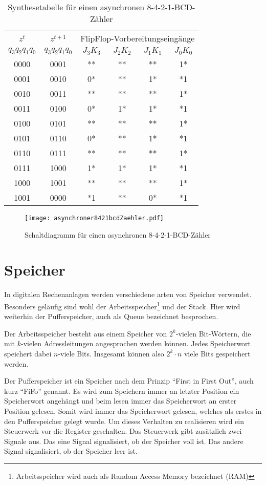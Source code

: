 \begin{table}[htp]
\centering
\begin{tabular}{cc|cccc}
$z^t$ & $z^{t+1}$ & \multicolumn{4}{|c}{FlipFlop-Vorbereitungseingänge}\\
$q_3q_2q_1q_0$ & $q_3q_2q_1q_0$ & $J_3K_3$ & $J_2K_2$ & $J_1K_1$ & $J_0K_0$\\ \hline
0000 & 0001 & ** & ** & ** & 1*\\
0001 & 0010 & 0* & ** & 1* & *1\\
0010 & 0011 & ** & ** & ** & 1*\\
0011 & 0100 & 0* & 1* & 1* & *1\\
0100 & 0101 & ** & ** & ** & 1*\\
0101 & 0110 & 0* & ** & 1* & *1\\
0110 & 0111 & ** & ** & ** & 1*\\
0111 & 1000 & 1* & 1* & 1* & *1\\
1000 & 1001 & ** & ** & ** & 1*\\
1001 & 0000 & *1 & ** & 0* & *1\\
\end{tabular}
\caption{Synthesetabelle für einen asynchronen 8-4-2-1-BCD-Zähler}
\label{AsyZaehTab}
\end{table}

\begin{figure}[htp]
	\centering
	\texttt{[image: asynchroner8421bcdZaehler.pdf]}
	\caption{Schaltdiagramm für einen asynchronen 8-4-2-1-BCD-Zähler}
	\label{AsyZaehScha}
\end{figure}

\section{Speicher}
In digitalen Rechenanlagen werden verschiedene arten von Speicher verwendet. Besonders geläufig sind wohl der Arbeitsspeicher\footnote{Arbeitsspeicher wird auch als Random Access Memory bezeichnet (RAM)} und der Stack. Hier wird weiterhin der Pufferspeicher, auch als Queue bezeichnet besprochen.

Der Arbeitsspeicher besteht aus einem Speicher von $2^k$-vielen Bit-Wörtern, die mit $k$-vielen Adressleitungen angesprochen werden können. Jedes Speicherwort speichert dabei $n$-viele Bits. Insgesamt können also $2^k \cdot n$ viele Bits gespeichert werden.

Der Pufferspeicher ist ein Speicher nach dem Prinzip "`First in First Out"', auch kurz "`FiFo"' genannt. Es wird zum Speichern immer an letzter Position ein Speicherwort angehängt und beim lesen immer das Speicherwort an erster Position gelesen. Somit wird immer das Speicherwort gelesen, welches als erstes in den Pufferspeicher gelegt wurde. Um dieses Verhalten zu realisieren wird ein Steuerwerk vor die Register geschalten. Das Steuerwerk gibt zusätzlich zwei Signale aus. Das eine Signal signalisiert, ob der Speicher voll ist. Das andere Signal signalisiert, ob der Speicher leer ist.

